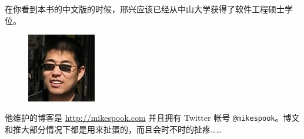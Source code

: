 在你看到本书的中文版的时候，邢兴应该已经从中山大学获得了软件工程硕士学位。
\begin{figure}
  \begin{center}
  \includegraphics[width=3cm]{fig/avatar-xingx-128x128}
  \end{center}
\end{figure}

他维护的博客是 \url{http://mikespook.com} 并且拥有 Twitter 帐号
\texttt{@mikespook}。博文和推大部分情况下都是用来扯蛋的，而且会时不时的扯疼……
